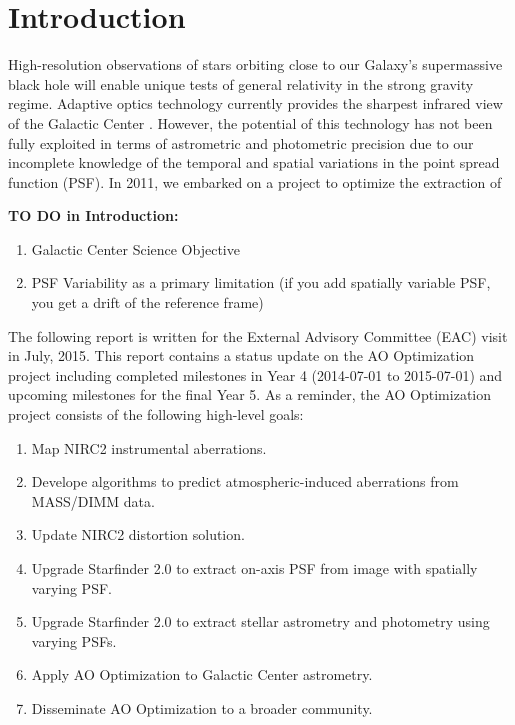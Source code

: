 \section{Introduction}

High-resolution observations of stars orbiting close to our Galaxy's supermassive black hole will enable unique tests of general relativity in the strong gravity regime. Adaptive optics technology currently provides the sharpest infrared view of the Galactic Center \cite{Ghez_2005}. However, the potential of this technology has not been fully exploited in terms of astrometric and photometric precision due to our incomplete knowledge of the temporal and spatial variations in the point spread function (PSF). In 2011, we embarked on a project to optimize the extraction of  

{\bf TO DO in Introduction:}
\begin{enumerate}
\item Galactic Center Science Objective
\item PSF Variability as a primary limitation (if you add spatially variable PSF, you get a drift of the reference frame)
\end{enumerate}


The following report is written for the External Advisory Committee (EAC) visit in July, 2015. This report contains a status update on the AO Optimization project including completed milestones in Year 4 (2014-07-01 to 2015-07-01) and upcoming milestones for the final Year 5. As a reminder, the AO Optimization project consists of the following high-level goals:
\begin{enumerate}
\item Map NIRC2 instrumental aberrations.
\item Develope algorithms to predict atmospheric-induced aberrations from MASS/DIMM data.
\item Update NIRC2 distortion solution.
\item Upgrade Starfinder 2.0 to extract on-axis PSF from image with spatially varying PSF.
\item Upgrade Starfinder 2.0 to extract stellar astrometry and photometry using varying PSFs.
\item Apply AO Optimization to Galactic Center astrometry.
\item Disseminate AO Optimization to a broader community.
\end{enumerate}




    
    
    
    
    
    
    
  
  